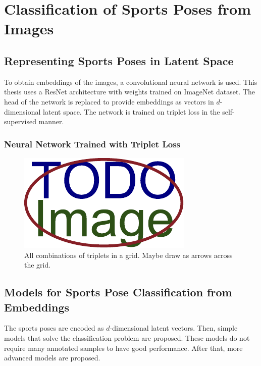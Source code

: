 \chapter{\label{chap:classification}Classification of Sports Poses from Images}


\blindtext

\blindtext

\section{Representing Sports Poses in Latent Space}

To obtain embeddings of the images, a convolutional neural network is used. This thesis uses a ResNet architecture with weights trained on ImageNet dataset. The head of the network is replaced to provide embeddings as vectors in $d$-dimensional latent space. The network is trained on triplet loss in the self-supervised manner.

\subsection{Neural Network Trained with Triplet Loss}

\blindtext

\blindtext

\begin{figure}[ht]\centering
  \centering
  \includegraphics{figures/placeholder.pdf}
  \caption{All combinations of triplets in a grid. Maybe draw as arrows across the grid.}
  \label{TripletsInGrid}
\end{figure}

\blindtext

\section{Models for Sports Pose Classification from Embeddings}

The sports poses are encoded as $d$-dimensional latent vectors. Then, simple models that solve the classification problem are proposed. These models do not require many annotated samples to have good performance. After that, more advanced models are proposed.
\blindtext


